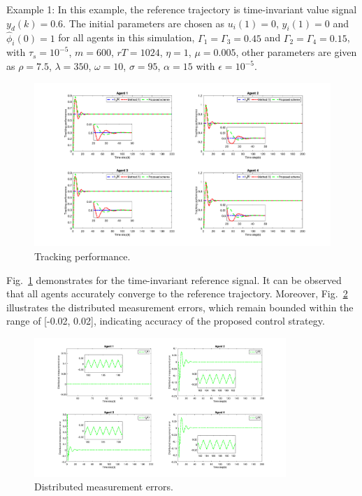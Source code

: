 \documentclass[journal,onecolumn]{IEEEtran}
\begin{document}
Example 1: In this example, the reference trajectory is time-invariant value signal $ y_d(k) = 0.6 $. The initial parameters are chosen as \(u_i(1)=0\), \(y_i(1)=0\) and \(\hat{\phi}_i(0)=1 \) for all agents in this simulation, \(\Gamma_{1}=\Gamma_{3}=0.45\) and \(\Gamma_{2}=\Gamma_{4}=0.15\), with \(\tau_s=10^{-5}\), \(m=600\), $rT = 1024 $, \(\eta=1\), \(\mu=0.005\), other parameters are given as \(\rho=7.5\), \(\lambda=350\), $ \omega = 10 $, $ \sigma=95 $, \(\alpha=15\) with \(\epsilon=10^{-5}\).
\begin{figure}[H]
    \centering
    \includegraphics[width=0.85 \textwidth]{inv_tracking.png}
    \caption{Tracking performance.}
    \label{fig:tracking_inv} %
\end{figure}


Fig.~\ref{fig:tracking_inv} demonstrates for the time-invariant reference signal. It can be observed that all agents accurately converge to the reference trajectory. Moreover, Fig.~\ref{fig:error_inv} illustrates the distributed measurement errors, which remain bounded within the range of [-0.02, 0.02], indicating accuracy of the proposed control strategy. 

\begin{figure}[H]
    \centering
    \includegraphics[width=0.85\textwidth]{inv_error.png}
    \caption{Distributed measurement errors.}
    \label{fig:error_inv} %
\end{figure}
\end{document}
